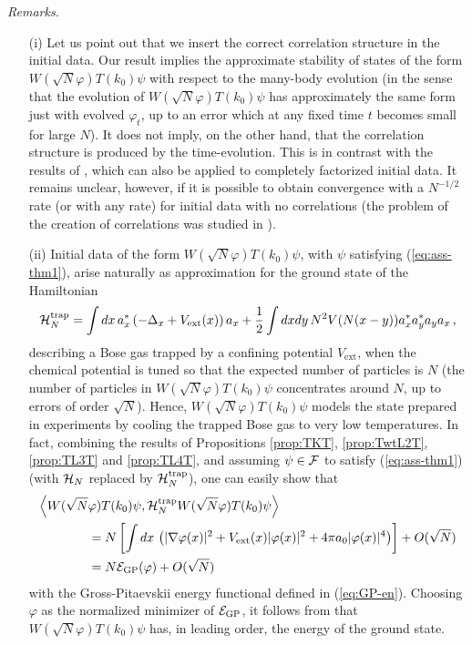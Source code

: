 \documentclass[11pt,a4paper]{article}
\newcommand{\cF}{{\cal F}}
\newcommand{\cE}{{\cal E}}
\newcommand{\cH}{{\cal H}}
\begin{document}
{\it Remarks.}
\begin{itemize}
\item[(i)] Let us point out that we insert the correct correlation structure in the initial data. Our result implies the approximate stability of states of the form $W(\sqrt{N} \varphi) T(k_0) \psi$ with respect to the many-body evolution (in the sense that the evolution of $W(\sqrt{N} \varphi) T(k_0) \psi$ has approximately the same form just with evolved $\varphi_t$, up to an error which at any fixed time $t$ becomes small for large $N$). It does not imply, on the other hand, that the correlation structure is produced by the time-evolution. This is in contrast with the results of \cite{ESY1,ESY2,ESY3,ESY4}, which can also be applied to completely factorized initial data. It remains unclear, however, if it is possible to obtain convergence with a $N^{-1/2}$ rate (or with any rate) for initial data with no correlations (the problem of the creation of correlations was studied in \cite{EMS}).
\item[(ii)] Initial data of the form $W(\sqrt{N}\varphi) T(k_0)\psi$, with $\psi$ satisfying (\ref{eq:ass-thm1}), arise naturally as approximation for the ground state of the Hamiltonian 
\[ \cH_N^{\text{trap}} = \int dx \, a_x^* \left( -\Delta_x + V_{\text{ext}} (x) \right) a_x + \frac{1}{2} \int dx dy \, N^2 V (N (x-y)) a_x^* a_y^* a_y a_x \, , \]
describing a Bose gas trapped by a confining potential $V_{\text{ext}}$, when the chemical potential is tuned so that the expected number of particles is $N$ (the number of particles in  $W(\sqrt{N}\varphi) T(k_0)\psi$ concentrates around $N$, up to errors of order $\sqrt{N}$). Hence, $W(\sqrt{N}\varphi) T(k_0)\psi$ models the state prepared in experiments by cooling the trapped Bose gas to very low temperatures. In fact, combining the results of Propositions \ref{prop:TKT}, \ref{prop:TwtL2T}, \ref{prop:TL3T} and \ref{prop:TL4T}, and assuming $\psi \in \cF$ to satisfy (\ref{eq:ass-thm1}) (with $\cH_N$ replaced by $\cH_N^{\text{trap}}$), one can easily show that 
\[ \begin{split} \Big\langle W(\sqrt{N} &\varphi) T(k_0)\psi, \cH_N^{\text{trap}} W(\sqrt{N}\varphi) T(k_0)\psi \Big\rangle \\ &= N \left[ \int dx \, \left( |\nabla \varphi (x)|^2 + V_{\text{ext}} (x) |\varphi (x)|^2 + 4 \pi a_0 |\varphi (x)|^4 \right) \right] + O (\sqrt{N}) \\ & = N \cE_{\text{GP}} (\varphi) + O (\sqrt{N}) \end{split} \]
with the Gross-Pitaevskii energy functional defined in (\ref{eq:GP-en}). Choosing $\varphi$ as the normalized minimizer of $\cE_{\text{GP}}$, it follows from \cite{LSY} that $W(\sqrt{N}\varphi) T(k_0)\psi$ has, in leading order, the energy of the ground state. 

\end{itemize}
\end{document}
